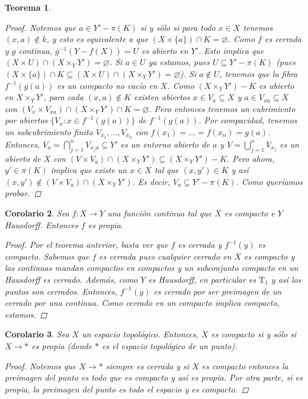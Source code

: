 \documentclass[12pt]{book}
\newtheorem{teo}{Teorema}[section]
\newtheorem{cor}[teo]{Corolario}
\theoremstyle{definition}
\let\emptyset\varnothing
\begin{document}
\begin{teo}
\begin{proof}
Notemos que $a\in Y' - \pi(K)$ si y sólo si para todo $x\in X$ tenemos $(x,a)\notin k$, y esto es equivalente a que $(X\times\{a\})\cap K=\emptyset$. Como $f$ es cerrada y $g$ continua, $g^{-1}(Y-f(X))=U$ es abierto en $Y'$. Esto implica que $(X\times U)\cap (X\times_Y Y')=\emptyset$. Si $a\in U$ ya estamos, pues $U\subseteq Y'-\pi(K)$ (pues $(X\times \{a\})\cap K \subseteq (X\times U)\cap (X\times_Y Y') = \emptyset$). Si $a\notin U$, tenemos que la fibra $f^{-1}(g(a))$ es un compacto no vacío en $X$. Como $(X\times_Y Y')-K$ es abierto en $X\times_Y Y'$, para cada $(x,a)\notin K$ existen abiertos $x\in V_x\subseteq X$ y $a\in V_{xa}\subseteq X$ con $(V_x\times V_{xa})\cap (X \times_Y Y')\cap K = \emptyset$. Pero entonces tenemos un cubrimiento por abiertos $\{V_x : x\in f^{-1}(g(a))\}$ de $f^{-1}(g(a))$. Por compacidad, tenemos un subcubrimiento finito $V_{x_1},\ldots , V_{x_n}$ con $f(x_1)=\ldots = f(x_n) = g(a)$. Entonces, $V_a = \displaystyle\bigcap_{j=1}^n V_{x_j a}\subseteq Y'$ es un entorno abierto de $a$ y $V=\displaystyle\bigcup_{j=1}^n V_{x_j}$ es un abierto de $X$ con $(V\times V_a)\cap (X\times_Y Y')\subseteq (X\times_Y Y')-K$. Pero ahora, $y'\in \pi(K)$ implica que existe un $x\in X$ tal que $(x,y')\in K$ y así $(x,y')\notin (V\times V_a)\cap (X\times_Y Y')$. Es decir, $V_a\subseteq Y' - \pi(K)$. Como queríamos probar.

\end{proof}
\end{teo}

\begin{cor}
Sea $f:X\to Y$ una función continua tal que $X$ es compacto e $Y$ Hausdorff. Entonces $f$ es propia.
\begin{proof}
Por el teorema anterior, basta ver que $f$ es cerrada y $f^{-1}(y)$ es compacto. Sabemos que $f$ es cerrada pues cualquier cerrado en $X$ es compacto y las continuas mandan compactos en compactos y un subconjunto compacto en un Hausdorff es cerrado. Además, como $Y$ es Hausdorff, en particular es $\mathrm{T}_1$ y así los puntos son cerrados. Entonces, $f^{-1}(y)$ es cerrado por ser preimagen de un cerrado por una continua. Como cerrado en un compacto implica compacto, estamos.
\end{proof}
\end{cor}

\begin{cor}
Sea $X$ un espacio topológico. Entonces, $X$ es compacto si y sólo si $X\to *$ es propia (donde $*$ es el espacio topológico de un punto).
\begin{proof}
Notemos que $X\to *$ siempre es cerrada y si $X$ es compacto entonces la preimagen del punto es todo que es compacto y así es propia. Por otra parte, si es propia, la preimagen del punto es todo el espacio y es compacto.
\end{proof}
\end{cor}
\end{document}
